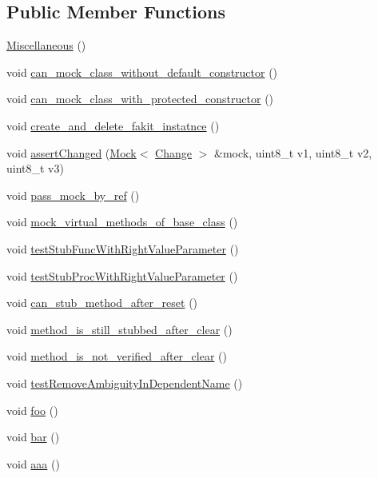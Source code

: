 \subsection*{Public Member Functions}
\begin{DoxyCompactItemize}
\item 
\mbox{\hyperlink{structMiscellaneous_a93711978cbfc7e77fe5d6f054880a3b1}{Miscellaneous}} ()
\item 
void \mbox{\hyperlink{structMiscellaneous_a939f777d8a6bc6c8f5ca67aa24a54a10}{can\+\_\+mock\+\_\+class\+\_\+without\+\_\+default\+\_\+constructor}} ()
\item 
void \mbox{\hyperlink{structMiscellaneous_ae46a0388ab5f287be832e6ef071bed9b}{can\+\_\+mock\+\_\+class\+\_\+with\+\_\+protected\+\_\+constructor}} ()
\item 
void \mbox{\hyperlink{structMiscellaneous_af73e8a80f462acc085f6a83690d33676}{create\+\_\+and\+\_\+delete\+\_\+fakit\+\_\+instatnce}} ()
\item 
void \mbox{\hyperlink{structMiscellaneous_afbc069b3450db473938a6bc0614363d5}{assert\+Changed}} (\mbox{\hyperlink{classfakeit_1_1Mock}{Mock}}$<$ \mbox{\hyperlink{structMiscellaneous_1_1Change}{Change}} $>$ \&mock, uint8\+\_\+t v1, uint8\+\_\+t v2, uint8\+\_\+t v3)
\item 
void \mbox{\hyperlink{structMiscellaneous_a69803bdabb48064c83e10f32ea6699fc}{pass\+\_\+mock\+\_\+by\+\_\+ref}} ()
\item 
void \mbox{\hyperlink{structMiscellaneous_a3a10ddbc295b1f97562a0ded1708afc6}{mock\+\_\+virtual\+\_\+methods\+\_\+of\+\_\+base\+\_\+class}} ()
\item 
void \mbox{\hyperlink{structMiscellaneous_a8a33c8b6f5a98c424e0b2b87d8c9d243}{test\+Stub\+Func\+With\+Right\+Value\+Parameter}} ()
\item 
void \mbox{\hyperlink{structMiscellaneous_aedb44a371ae0b7b08114ad63a3e32929}{test\+Stub\+Proc\+With\+Right\+Value\+Parameter}} ()
\item 
void \mbox{\hyperlink{structMiscellaneous_a441e7b504a06d307f91b35ec81451627}{can\+\_\+stub\+\_\+method\+\_\+after\+\_\+reset}} ()
\item 
void \mbox{\hyperlink{structMiscellaneous_a97dc4a8d7b2b86df908285acc9bcfb61}{method\+\_\+is\+\_\+still\+\_\+stubbed\+\_\+after\+\_\+clear}} ()
\item 
void \mbox{\hyperlink{structMiscellaneous_af97c544ddec14d0de642fe83fdd7ee2c}{method\+\_\+is\+\_\+not\+\_\+verified\+\_\+after\+\_\+clear}} ()
\item 
void \mbox{\hyperlink{structMiscellaneous_a4bb6a64703965188999f785d0a9380de}{test\+Remove\+Ambiguity\+In\+Dependent\+Name}} ()
\item 
void \mbox{\hyperlink{structMiscellaneous_a726872d2122ee555d1836080216da395}{foo}} ()
\item 
void \mbox{\hyperlink{structMiscellaneous_a565c59e4e7a64ea2135e31db72251a21}{bar}} ()
\item 
void \mbox{\hyperlink{structMiscellaneous_a5fa674e93dcc8ede12487be40bda82ff}{aaa}} ()
\end{DoxyCompactItemize}

